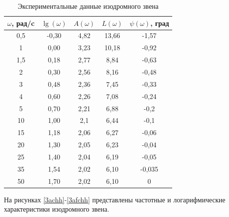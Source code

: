 \documentclass[a4paper, 12pt]{article}
\begin{document}
\begin{table}[h]
	\centering
	
	\begin{threeparttable}
	\caption{Экспериментальные данные изодромного звена}
	\label{tab:izodr}
	\begin{tabular}{|c|c|c|c|c|}
		\hline
		$\omega$, рад/c   & $\lg(\omega)$   & $A(\omega)$ & $L(\omega)$    & $\psi(\omega)$, град   \\
		\hline
		0,5 & -0,30 & 4,82 & 13,66     & -1,57  \\
		\hline
		1   & 0,00  & 3,23 & 10,18     & -0,92  \\
		\hline
		1,5 & 0,18  & 2,77 & 8,84     & -0,63  \\
		\hline
		2   & 0,30  & 2,56 & 8,16     & -0,48  \\
		\hline
		3   & 0,48  & 2,36 & 7,45     & -0,33  \\
		\hline
		4   & 0,60  & 2,26 & 7,08     & -0,24  \\
		\hline
		5   & 0,70  & 2,21 & 6,88     & -0,2   \\
		\hline
		10  & 1,00  & 2,1  & 6,44     & -0,1   \\
		\hline
		15  & 1,18  & 2,06 & 6,27    & -0,06  \\
		\hline
		20  & 1,30  & 2,05 & 6,23    & -0,04  \\
		\hline
		25  & 1,40  & 2,04 & 6,19    & -0,05  \\
		\hline
		35  & 1,54  & 2,02 & 6,10    & -0,035 \\
		\hline
		50  & 1,70  & 2,02 & 6,10    & 0     \\
		\hline
	\end{tabular}
\end{threeparttable}
\end{table}

На рисунках \ref{3achh}-\ref{3afchh} представлены частотные и логарифмические характеристики изодромного звена.

\newpage
\end{document}
